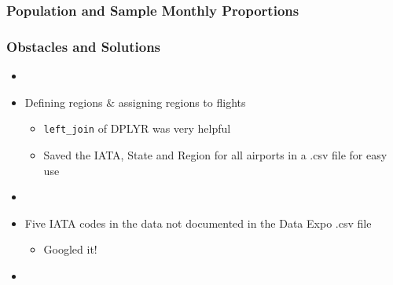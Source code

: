 \documentclass{beamer}
\begin{document}
\begin{frame}
\frametitle{Population and Sample Monthly Proportions}
\begin{center}
\end{center}
\end{frame}








\begin{frame}
\frametitle{Obstacles and Solutions}
\begin{itemize}

\item[]

\item Defining regions $\&$ assigning regions to flights
\begin{itemize}
\item \texttt{left\_join} of DPLYR was very helpful
\item Saved the IATA, State and Region for all airports in a .csv file for easy use
\end{itemize}

\item[]

\item Five IATA codes in the data not documented in the Data Expo .csv file
\begin{itemize}
\item Googled it!
\end{itemize}

\item[]

\end{itemize}
\end{frame}
\end{document}
